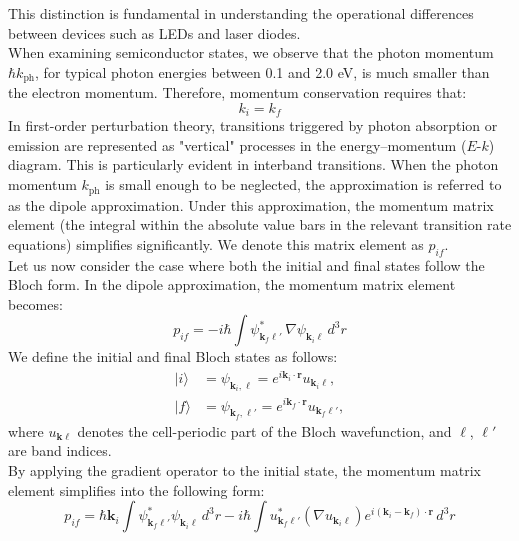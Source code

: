 This distinction is fundamental in understanding the operational differences between devices such as LEDs and laser diodes.\\
When examining semiconductor states, we observe that the photon momentum \(\hbar k_{\text{ph}}\), for typical photon energies between 0.1 and 2.0 eV, is much smaller than the electron momentum. Therefore, momentum conservation requires that:
\begin{equation}
k_i = k_f
\end{equation}
In first-order perturbation theory, transitions triggered by photon absorption or emission are represented as "vertical" processes in the energy–momentum (\(E\)-\(k\)) diagram. This is particularly evident in interband transitions. When the photon momentum \(k_{\text{ph}}\) is small enough to be neglected, the approximation is referred to as the dipole approximation. Under this approximation, the momentum matrix element (the integral within the absolute value bars in the relevant transition rate equations) simplifies significantly. We denote this matrix element as \(p_{if}\).\\
Let us now consider the case where both the initial and final states follow the Bloch form. In the dipole approximation, the momentum matrix element becomes:
\begin{equation}
p_{if} = -i\hbar \int \psi^*_{\mathbf{k}_f \ell'} \, \nabla \psi_{\mathbf{k}_i \ell} \, d^3 r
\end{equation}
We define the initial and final Bloch states as follows:
\[
\begin{aligned}
    |i\rangle &= \psi_{\mathbf{k}_i, \ell} = e^{i \mathbf{k}_i \cdot \mathbf{r}} u_{\mathbf{k}_i \ell}, \\
    |f\rangle &= \psi_{\mathbf{k}_f, \ell'} = e^{i \mathbf{k}_f \cdot \mathbf{r}} u_{\mathbf{k}_f \ell'},
\end{aligned}
\]
where \( u_{\mathbf{k} \ell} \) denotes the cell-periodic part of the Bloch wavefunction, and \(\ell\), \(\ell'\) are band indices.\\
By applying the gradient operator to the initial state, the momentum matrix element simplifies into the following form:
\begin{equation}
p_{if} = \hbar \mathbf{k}_i \int \psi^*_{\mathbf{k}_f \ell'} \psi_{\mathbf{k}_i \ell} \, d^3 r 
- i\hbar \int u^*_{\mathbf{k}_f \ell'} \left( \nabla u_{\mathbf{k}_i \ell} \right) 
e^{i(\mathbf{k}_i - \mathbf{k}_f) \cdot \mathbf{r}} \, d^3 r
\end{equation}
